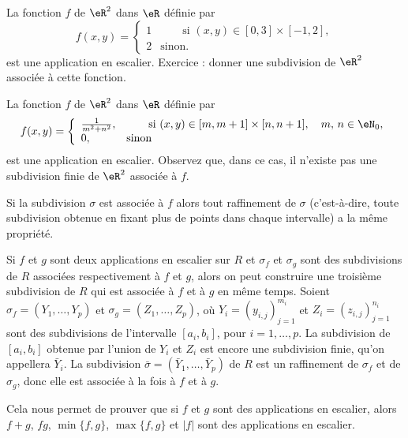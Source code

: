\begin{example}
	La fonction \( f\) de \( \eR^2\) dans \( \eR\) définie par
	\begin{equation}
		f(x,y)=\left\{
		\begin{array}{ll}
			1 & \qquad \textrm{si } (x,y) \in [0,3]\times[-1,2], \\
			2 & \textrm{sinon.}
		\end{array}\right.
	\end{equation}
	est une application en escalier. Exercice : donner une subdivision de \( \eR^2\) associée à cette fonction.
\end{example}

\begin{example}
	La fonction \( f\) de \( \eR^2\) dans \( \eR\) définie par
	\begin{equation}
		f(x,y)=\left\{
		\begin{array}{ll}
			\frac{1}{m^2+n^2}, & \qquad \textrm{si } (x,y) \in [m,m+1]\times[n,n+1], \quad m,\,n\in\eN_0, \\
			0,                 & \textrm{sinon}
		\end{array}\right.
	\end{equation}
	est une application en escalier. Observez que, dans ce cas, il n'existe pas une subdivision finie de \( \eR^2\) associée à \( f\).
\end{example}
\begin{remark}
	Si la subdivision \( \sigma\) est associée à \( f\) alors tout raffinement de \( \sigma\) (c'est-à-dire, toute subdivision obtenue en fixant plus de points dans chaque intervalle) a la même propriété.

	Si \( f\) et \( g\) sont deux applications en escalier sur \( R\) et \( \sigma_f\) et \( \sigma_g\) sont des subdivisions de \( R\) associées respectivement à \( f\) et \( g\), alors on peut construire une troisième subdivision de \( R\) qui est associée à \( f\) et à \( g\) en même temps. Soient \( \sigma_f=(Y_{1},\ldots, Y_{p})\) et \( \sigma_g=(Z_{1},\ldots, Z_{p})\), où \( Y_{i}=(y_{i,j})_{j=1}^{m_i}\) et \( Z_{i}=(z_{i,j})_{j=1}^{n_i}\) sont des subdivisions de l'intervalle \( [a_i, b_i]\), pour \( i=1,\ldots, p\). La subdivision de \( [a_i, b_i]\) obtenue par l'union de \( Y_i\) et \( Z_i\) est encore une subdivision finie, qu'on appellera \( \bar Y_i\). La subdivision \( \bar \sigma = (\bar Y_{1},\ldots,\bar Y_{p})\) de \( R\) est un raffinement de \( \sigma_f \) et de \( \sigma_g\), donc elle est associée à la fois à \( f\) et à \( g\).

	Cela nous permet de prouver que si \( f\) et \( g\) sont des applications en escalier, alors \( f+g\), \( fg\), \( \min\{f,g\}\), \( \max\{f,g\}\) et \( |f|\) sont des applications en escalier.
\end{remark}

